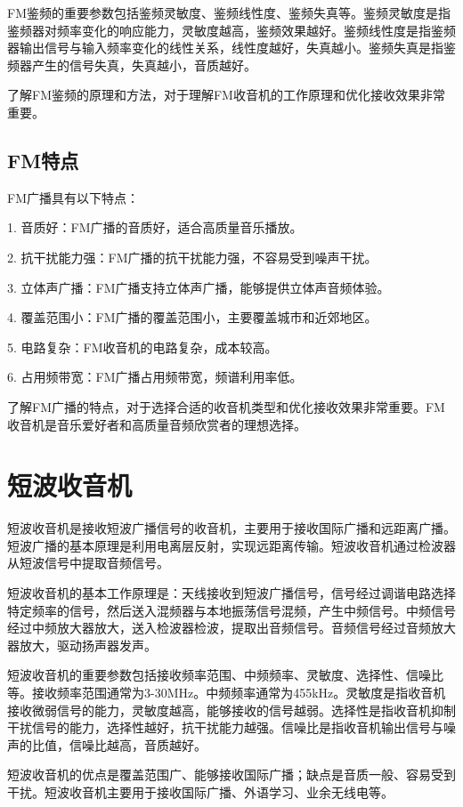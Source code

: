 \documentclass[12pt,UTF8]{ctexbook}
\begin{document}
FM鉴频的重要参数包括鉴频灵敏度、鉴频线性度、鉴频失真等。鉴频灵敏度是指鉴频器对频率变化的响应能力，灵敏度越高，鉴频效果越好。鉴频线性度是指鉴频器输出信号与输入频率变化的线性关系，线性度越好，失真越小。鉴频失真是指鉴频器产生的信号失真，失真越小，音质越好。

了解FM鉴频的原理和方法，对于理解FM收音机的工作原理和优化接收效果非常重要。

\subsection{FM特点}

FM广播具有以下特点：

1. 音质好：FM广播的音质好，适合高质量音乐播放。

2. 抗干扰能力强：FM广播的抗干扰能力强，不容易受到噪声干扰。

3. 立体声广播：FM广播支持立体声广播，能够提供立体声音频体验。

4. 覆盖范围小：FM广播的覆盖范围小，主要覆盖城市和近郊地区。

5. 电路复杂：FM收音机的电路复杂，成本较高。

6. 占用频带宽：FM广播占用频带宽，频谱利用率低。

了解FM广播的特点，对于选择合适的收音机类型和优化接收效果非常重要。FM收音机是音乐爱好者和高质量音频欣赏者的理想选择。

\section{短波收音机}

短波收音机是接收短波广播信号的收音机，主要用于接收国际广播和远距离广播。短波广播的基本原理是利用电离层反射，实现远距离传输。短波收音机通过检波器从短波信号中提取音频信号。

短波收音机的基本工作原理是：天线接收到短波广播信号，信号经过调谐电路选择特定频率的信号，然后送入混频器与本地振荡信号混频，产生中频信号。中频信号经过中频放大器放大，送入检波器检波，提取出音频信号。音频信号经过音频放大器放大，驱动扬声器发声。

短波收音机的重要参数包括接收频率范围、中频频率、灵敏度、选择性、信噪比等。接收频率范围通常为3-30MHz。中频频率通常为455kHz。灵敏度是指收音机接收微弱信号的能力，灵敏度越高，能够接收的信号越弱。选择性是指收音机抑制干扰信号的能力，选择性越好，抗干扰能力越强。信噪比是指收音机输出信号与噪声的比值，信噪比越高，音质越好。

短波收音机的优点是覆盖范围广、能够接收国际广播；缺点是音质一般、容易受到干扰。短波收音机主要用于接收国际广播、外语学习、业余无线电等。
\end{document}
